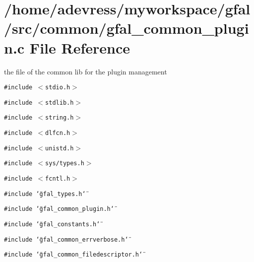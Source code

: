 \section{/home/adevress/myworkspace/gfal/src/common/gfal\_\-common\_\-plugin.c File Reference}
\label{gfal__common__plugin_8c}
the file of the common lib for the plugin management 

{\tt \#include $<$stdio.h$>$}\par
{\tt \#include $<$stdlib.h$>$}\par
{\tt \#include $<$string.h$>$}\par
{\tt \#include $<$dlfcn.h$>$}\par
{\tt \#include $<$unistd.h$>$}\par
{\tt \#include $<$sys/types.h$>$}\par
{\tt \#include $<$fcntl.h$>$}\par
{\tt \#include \char`\"{}gfal\_\-types.h\char`\"{}}\par
{\tt \#include \char`\"{}gfal\_\-common\_\-plugin.h\char`\"{}}\par
{\tt \#include \char`\"{}gfal\_\-constants.h\char`\"{}}\par
{\tt \#include \char`\"{}gfal\_\-common\_\-errverbose.h\char`\"{}}\par
{\tt \#include \char`\"{}gfal\_\-common\_\-filedescriptor.h\char`\"{}}\par
